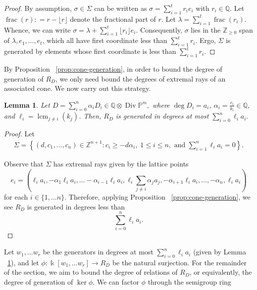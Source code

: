 \documentclass{amsart}
\theoremstyle{plain}
\newtheorem{lem}[thm]{Lemma}
\theoremstyle{definition}
\theoremstyle{remark}
\numberwithin{equation}{section}
\newcommand\bq{{\mathbb Q}}
\newcommand\bp{{\mathbb P}}
\newcommand\bz{{\mathbb Z}}
\newcommand\bk{{\Bbbk}}
\DeclareMathOperator\di{Div}
\newcommand\bida{a}
\DeclareMathOperator{\fr}{frac}
\DeclareMathOperator{\lcm}{lcm}
\begin{document}
\begin{proof}
By assumption, $\sigma \in \Sigma$ can be written as $\sigma = \sum_
{i = 1}^{t} r_i e_i$ with $r_i \in \bq$. Let $\fr(r) \colon = r - \lfloor r
\rfloor$ denote the fractional part of $r$. Let $\lambda = \sum_{i = 1}
^{t} \fr(r_i)$. Whence, we can write $\sigma = \lambda + \sum_{i = 1}
^{t} \lfloor r_i \rfloor e_i.$ Consequently, $\sigma$ lies in the
$\bz_{\geq 0}$ span of $\lambda, e_1, \ldots, e_t$, which all have
first coordinate less than $\sum_{i=1}^{t} r_i$. Ergo, $\Sigma$ is
generated by elements whose first coordinate is less than
$\sum_{i = 1}^{t} r_i$.
\end{proof}

By Proposition ~\ref{prop:cone-generation}, in order to bound
the degree of generation of $R_D$, we only need bound
the degrees of extremal rays of an associated cone. We now carry out
this strategy.

\begin{lem} \label{lem:proj-generators}
Let $D = \sum_{i=0}^{n} \alpha_i D_i \in \bq \otimes \di \bp^m,$ where
$\deg D_i = \bida_i$, $\alpha_i = \frac{c_i}{k_i}\in \bq$, and
$\ell_i = \lcm_{j \neq i} (k_j)$. Then, $R_D$ is generated in degrees at most $\sum_{i=0}^n \ell_i \bida_i.$

\end{lem}
\begin{proof}
Let 
\begin{align}\label{eqn:Sigma-defn}
	\Sigma = \left \{(d, c_1, \ldots, c_n) \in \bz^{n+1} \colon c_i \geq - d
\alpha_i, \; 1 \leq i \leq n, \text{ and } \sum_{i=1}^{n} \ell_i \bida_i = 0
\right \}.
\end{align}

Observe that $\Sigma$ has extremal rays given by the lattice points 
\begin{equation}\label{eqn:e-i-proj}
	e_i = \left(\ell_i \bida_i, - \alpha_1 \ell_i \bida_i, \ldots
-\alpha_{i-1} \ell_i \bida_i, \ell_i \sum_{j\ne i} \alpha_j \bida_j,
-\alpha_{i+1} \ell_i \bida_i, \ldots, -\alpha_n, \ell_i \bida_i \right)
\end{equation}
for each $i\in \{1, \ldots n\}$.
Therefore, applying Proposition ~\ref{prop:cone-generation}, we see $R_D$ is generated in degrees less than
\[
	\sum_{i=0}^n \ell_i \bida_i.
\]
\end{proof}

Let $w_1, \ldots w_r$ be the generators in degrees at most $\sum_{i=0}^n \ell_i
\bida_i$ (given by Lemma ~\ref{lem:proj-generators}), and let 
$\phi \colon \bk[w_1, \ldots w_r] \to R_D$ be the natural surjection.
For the remainder of the section, we aim to bound the degree of relations
of $R_D$, or equivalently, the degree of generation of $\ker \phi$.
We can factor $\phi$ through the
semigroup ring 
\end{document}
